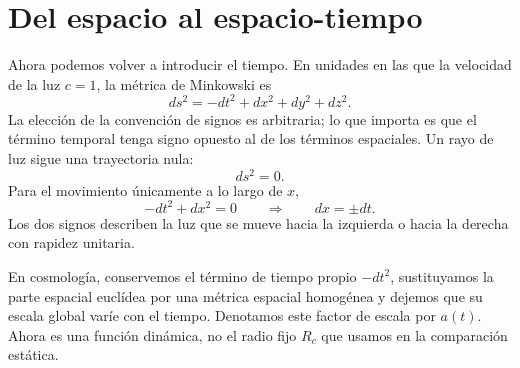 \begin{classroomqa}\end{classroomqa}

\section{Del espacio al espacio-tiempo}

Ahora podemos volver a introducir el tiempo. En unidades en las que la velocidad de la luz \(c=1\), la métrica de Minkowski es
\begin{equation}
ds^2 = -dt^2 + dx^2 + dy^2 + dz^2.
\label{eq:c03-minkowski}
\end{equation}
La elección de la convención de signos es arbitraria; lo que importa es que el término temporal tenga signo opuesto al de los términos espaciales. Un rayo de luz sigue una trayectoria nula:
\begin{equation}
ds^2 = 0.
\end{equation}
Para el movimiento únicamente a lo largo de \(x\),
\begin{equation}
-dt^2 + dx^2 = 0
\qquad\Rightarrow\qquad
dx = \pm dt.
\label{eq:c03-null-flat}
\end{equation}
Los dos signos describen la luz que se mueve hacia la izquierda o hacia la derecha con rapidez unitaria.

En cosmología, conservemos el término de tiempo propio \(-dt^2\), sustituyamos la parte espacial euclídea por una métrica espacial homogénea y dejemos que su escala global varíe con el tiempo. Denotamos este factor de escala por \(a(t)\). Ahora es una función dinámica, no el radio fijo \(R_c\) que usamos en la comparación estática.

